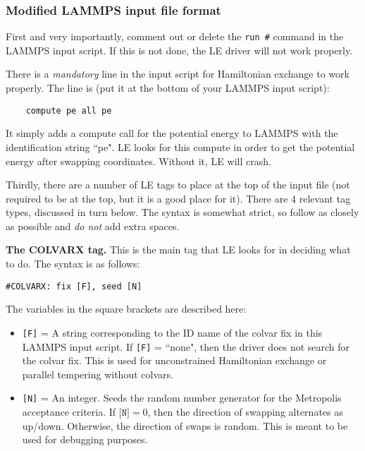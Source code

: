 \documentclass[10pt]{article}
\begin{document}
\subsubsection{Modified LAMMPS input file format}

First and very importantly, comment out
or delete the \texttt{run \#} command in the LAMMPS input script. If this is not done,
the LE driver will not work properly. 

There is a {\em mandatory} line in the input script for Hamiltonian exchange to work properly.
The line is (put it at the bottom of your LAMMPS input script):
\begin{verbatim}
	compute pe all pe
\end{verbatim}
It simply adds a compute call for the potential energy to LAMMPS with the identification string ``pe". LE looks
for this compute in order to get the potential energy after swapping coordinates. Without it, LE will crash.

Thirdly, there are a number of LE tags to place
at the top of the input file (not required to be at the top, but it is a good place for it). 
There are 4 relevant tag types, discussed in turn below. The syntax is somewhat strict,
so follow as closely as possible and {\em do not} add extra spaces.

\textbf{The COLVARX tag.}
This is the main tag that LE looks for in deciding what to do.
The syntax is as follows:
\begin{verbatim}
#COLVARX: fix [F], seed [N]
\end{verbatim}
The variables in the square brackets are described here:
\begin{itemize}
\item	\texttt{[F]} = A string corresponding to the ID name of the colvar fix
		in this LAMMPS input script. If \texttt{[F]} = ``none", then the driver does
		not search for the colvar fix. This is used for unconstrained Hamiltonian exchange
		or parallel tempering without colvars.
\item	\texttt{[N]} = An integer. Seeds the random number generator for the Metropolis
		acceptance criteria.
		If $\texttt{[N]} = 0$,
		then the direction of swapping alternates as up/down. Otherwise, the direction of swaps
		is random. This is meant to be used for debugging purposes.
\end{itemize}
\end{document}
